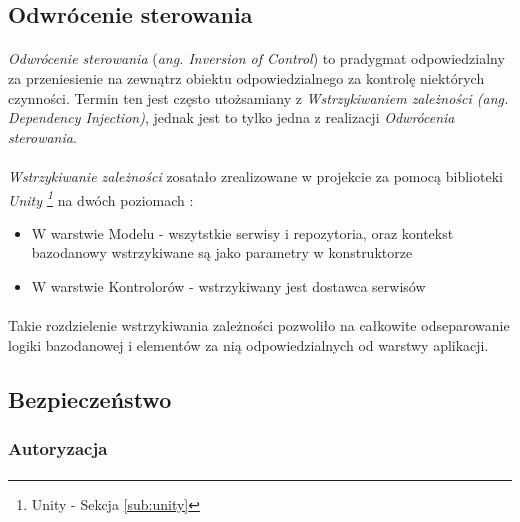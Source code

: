 \subsection{Odwrócenie sterowania} %
\label{sub:odwr_cenie_sterowania}
\paragraph{} 
\textit{Odwrócenie sterowania} (\textit{ang. Inversion of Control}) to pradygmat odpowiedzialny za przeniesienie na zewnątrz obiektu odpowiedzialnego za kontrolę niektórych czynności. Termin ten jest często utożsamiany z \textit{Wstrzykiwaniem zależności (ang. Dependency Injection)}, jednak jest to tylko jedna z realizacji \textit{Odwrócenia sterowania}. 

\paragraph{} %
\label{par:}
\textit{Wstrzykiwanie zależności} zosatało zrealizowane w projekcie za pomocą biblioteki \textit{Unity \footnote{Unity - Sekcja \ref{sub:unity}}} na dwóch poziomach :
\begin{itemize}
	\item W warstwie Modelu - wszytstkie serwisy i repozytoria, oraz kontekst bazodanowy wstrzykiwane są jako parametry w konstruktorze
	\item W warstwie Kontrolorów - wstrzykiwany jest dostawca serwisów
\end{itemize} 

\paragraph{} %
\label{par:}
Takie rozdzielenie wstrzykiwania zależności pozwoliło na całkowite odseparowanie logiki bazodanowej i elementów za nią odpowiedzialnych od warstwy aplikacji.

\subsection{Bezpieczeństwo} %
\subsubsection{Autoryzacja}
\paragraph{} %
\label{par:paragraph_name}

